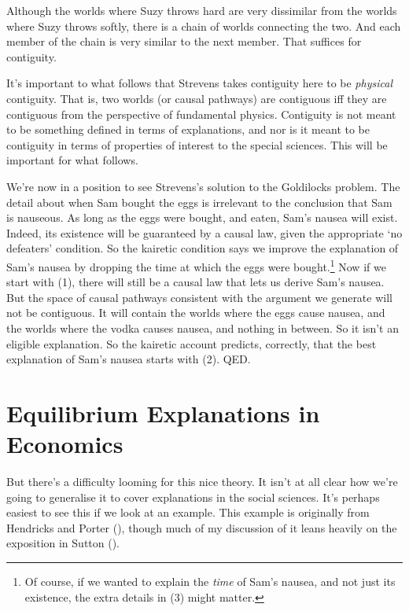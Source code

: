 \documentclass[
  10pt,
  letterpaper,
  DIV=11,
  numbers=noendperiod,
  twoside]{scrartcl}
\begin{document}
Although the worlds where Suzy throws hard are very dissimilar from the
worlds where Suzy throws softly, there is a chain of worlds connecting
the two. And each member of the chain is very similar to the next
member. That suffices for contiguity.

It's important to what follows that Strevens takes contiguity here to be
\emph{physical} contiguity. That is, two worlds (or causal pathways) are
contiguous iff they are contiguous from the perspective of fundamental
physics. Contiguity is not meant to be something defined in terms of
explanations, and nor is it meant to be contiguity in terms of
properties of interest to the special sciences. This will be important
for what follows.

We're now in a position to see Strevens's solution to the Goldilocks
problem. The detail about when Sam bought the eggs is irrelevant to the
conclusion that Sam is nauseous. As long as the eggs were bought, and
eaten, Sam's nausea will exist. Indeed, its existence will be guaranteed
by a causal law, given the appropriate `no defeaters' condition. So the
kairetic condition says we improve the explanation of Sam's nausea by
dropping the time at which the eggs were bought.\footnote{Of course, if
  we wanted to explain the \emph{time} of Sam's nausea, and not just its
  existence, the extra details in (3) might matter.} Now if we start
with (1), there will still be a causal law that lets us derive Sam's
nausea. But the space of causal pathways consistent with the argument we
generate will not be contiguous. It will contain the worlds where the
eggs cause nausea, and the worlds where the vodka causes nausea, and
nothing in between. So it isn't an eligible explanation. So the kairetic
account predicts, correctly, that the best explanation of Sam's nausea
starts with (2). QED.

\section{Equilibrium Explanations in
Economics}\label{equilibrium-explanations-in-economics}

But there's a difficulty looming for this nice theory. It isn't at all
clear how we're going to generalise it to cover explanations in the
social sciences. It's perhaps easiest to see this if we look at an
example. This example is originally from Hendricks and Porter
(), though much of my discussion
of it leans heavily on the exposition in Sutton
().
\end{document}

